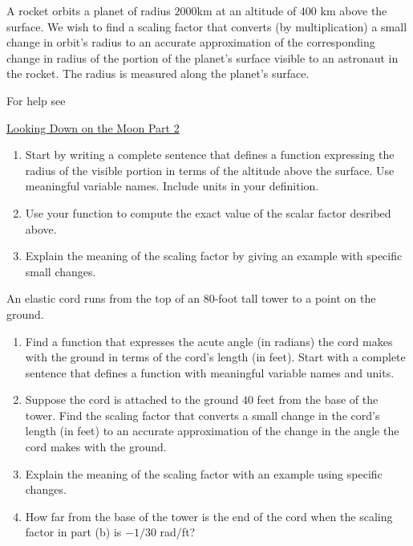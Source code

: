 \documentclass{ximera}
\begin{document}
\begin{question} \label{Qodfer3r}
A rocket orbits a planet of radius $2000$km at an altitude of $400$ km above the surface. We wish to find a scaling factor that converts (by multiplication) a small change in orbit's radius to an accurate approximation of the corresponding change in radius of the portion of the planet's surface visible to an astronaut in the rocket. The radius is measured along the planet's surface.

For help see 

\href{https://ximera.osu.edu/calcone/Calculus1/Horizon2/Horizon2}{Looking Down on the Moon Part 2}

\begin{enumerate}

\item Start by writing a complete sentence that defines a function expressing the radius of the visible portion in terms of the altitude above the surface. Use meaningful variable names. Include units in your definition.

\item Use your function to compute the exact value of the scalar factor desribed above.

\item Explain the meaning of the scaling factor by giving an example with specific small changes.

\end{enumerate}

\end{question}

\begin{question} \label{Qdfef3r00} 
An elastic cord runs from the top of an $80$-foot tall tower to a point on the ground. %

\begin{enumerate}

\item Find a function that expresses the acute angle (in radians)  the cord makes with the ground in terms of the cord's length (in feet). Start with a complete sentence that defines a function with meaningful variable names and units.

\item Suppose the cord is attached to the ground $40$ feet from the base of the tower. Find the scaling factor that converts a small change in the cord's length (in feet) to an accurate approximation of the change in the angle the cord makes with the ground.

\item Explain the meaning of the scaling factor with an example using specific changes.

\item How far from the base of the tower is the end of the cord when the scaling factor in part (b) is $-1/30$ rad/ft?

\end{enumerate}
\end{question}
\end{document}
